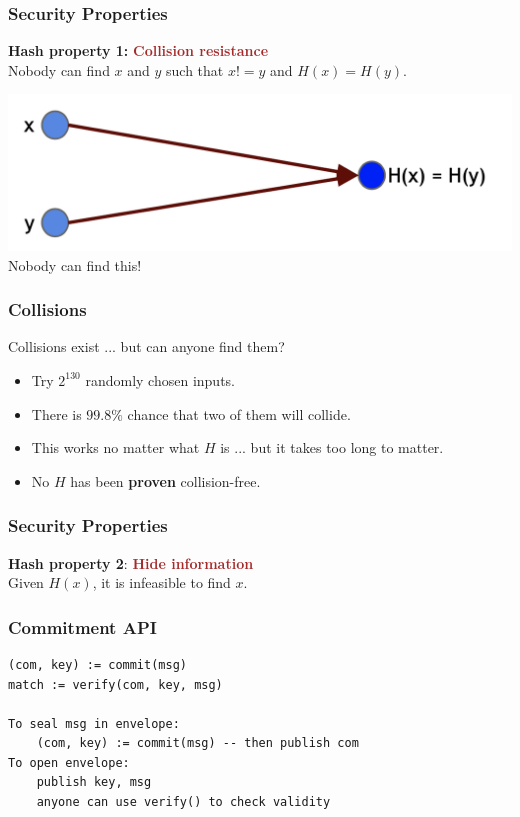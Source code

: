 \documentclass{beamer}
\begin{document}
\begin{frame}
  \frametitle{Security Properties}
  
  \begin{block}{\textbf{Hash property 1:}}
  \textcolor{brown}{\textbf{Collision resistance}} \\
Nobody can find $x$ and $y$ such that $x != y$ and $H(x)=H(y)$.
 	\end{block}
	\centering
	\includegraphics[scale=0.5]{property1}  \\ 
	Nobody can find this!
\end{frame}
\begin{frame}
  \frametitle{Collisions}
  Collisions exist ... \pause but can anyone find them?
	\begin{itemize}
		\item Try $2^{130}$ randomly chosen inputs.
		\item There is $99.8\%$ chance that two of them will collide. \pause 
		\item This works no matter what $H$ is ... \pause but it takes too long to matter.
		\pause
		\item No $H$ has been \textbf{proven} collision-free.
	\end{itemize}

\end{frame}
\begin{frame}
  \frametitle{Security Properties}
  
  \begin{block}{\textbf{Hash property 2}:}
  \textcolor{brown}{\textbf{Hide information}} \\
Given $H(x)$, it is infeasible to find $x$.
 	\end{block}
\end{frame}
\begin{frame}[fragile]
  \frametitle{Commitment API}
	\begin{verbatim}
(com, key) := commit(msg)
match := verify(com, key, msg)

To seal msg in envelope:
    (com, key) := commit(msg) -- then publish com
To open envelope:
    publish key, msg
    anyone can use verify() to check validity

	\end{verbatim}
\end{frame}
\end{document}
